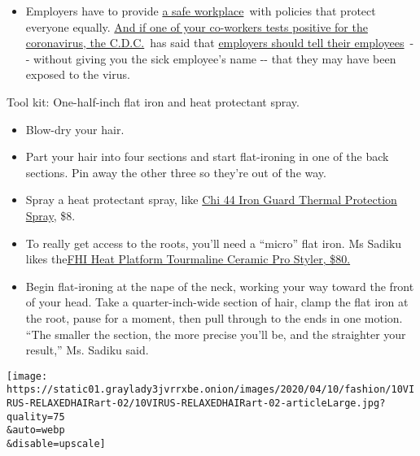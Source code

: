 \begin{itemize}
  \begin{itemize}
  \tightlist
  \item
    Employers have to provide
    \href{https://www.osha.gov/SLTC/covid-19/standards.html}{a safe
    workplace}~with policies that protect everyone equally.
    \href{https://www.nytimes3xbfgragh.onion/article/coronavirus-money-unemployment.html?action=click\&pgtype=Article\&state=default\&region=MAIN_CONTENT_3\&context=storylines_faq}{And
    if one of your co-workers tests positive for the coronavirus, the
    C.D.C.}~has said that
    \href{https://www.cdc.gov/coronavirus/2019-ncov/community/guidance-business-response.html}{employers
    should tell their employees}~-\/- without giving you the sick
    employee's name -\/- that they may have been exposed to the virus.
  \end{itemize}
\end{itemize}

Tool kit: One-half-inch flat iron and heat protectant spray.

\begin{itemize}
\item
  Blow-dry your hair.
\item
  Part your hair into four sections and start flat-ironing in one of the
  back sections. Pin away the other three so they're out of the way.
\item
  Spray a heat protectant spray, like
  \href{https://chi.com/chi-products/chi-haircare/chi-44-iron-guard-thermal-protecting-spray/}{Chi
  44 Iron Guard Thermal Protection Spray}, \$8.
\item
  To really get access to the roots, you'll need a ``micro'' flat iron.
  Ms Sadiku likes
  the\href{https://www.amazon.com/FHI-Platform-Tourmaline-Ceramic-Professional/dp/B00BJF8BHE}{FHI
  Heat Platform Tourmaline Ceramic Pro Styler, \$80.}
\item
  Begin flat-ironing at the nape of the neck, working your way toward
  the front of your head. Take a quarter-inch-wide section of hair,
  clamp the flat iron at the root, pause for a moment, then pull through
  to the ends in one motion. ``The smaller the section, the more precise
  you'll be, and the straighter your result,'' Ms. Sadiku said.
\end{itemize}

\texttt{[image: https://static01.graylady3jvrrxbe.onion/images/2020/04/10/fashion/10VIRUS-RELAXEDHAIRart-02/10VIRUS-RELAXEDHAIRart-02-articleLarge.jpg?quality=75\\\&auto=webp\\\&disable=upscale]}

